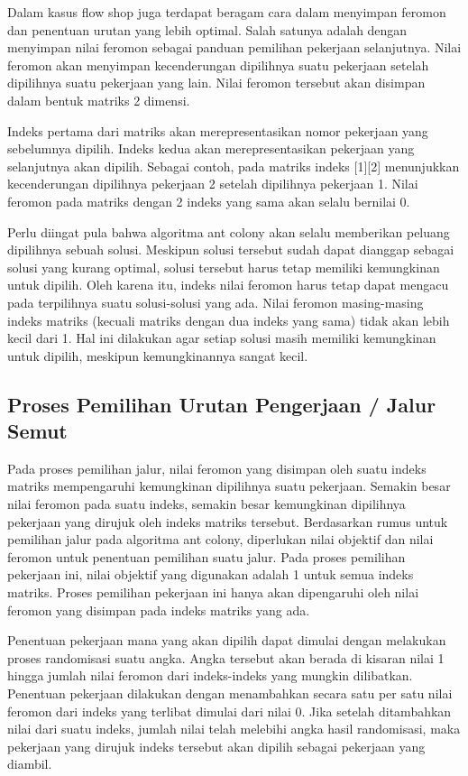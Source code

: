 	Dalam kasus flow shop juga terdapat beragam cara dalam menyimpan feromon dan
	penentuan urutan yang lebih optimal. Salah satunya adalah dengan menyimpan nilai feromon
	sebagai panduan pemilihan pekerjaan selanjutnya. Nilai feromon akan menyimpan kecenderungan
	dipilihnya suatu pekerjaan setelah dipilihnya suatu pekerjaan yang lain. Nilai feromon tersebut
	akan disimpan dalam bentuk matriks 2 dimensi.

	Indeks pertama dari matriks akan merepresentasikan nomor pekerjaan yang sebelumnya dipilih.
	Indeks kedua akan merepresentasikan pekerjaan yang selanjutnya akan dipilih. Sebagai contoh,
	pada matriks indeks [1][2] menunjukkan kecenderungan dipilihnya pekerjaan 2 setelah dipilihnya
	pekerjaan 1. Nilai feromon pada matriks dengan 2 indeks yang sama akan selalu bernilai 0.

	Perlu diingat pula bahwa algoritma ant colony akan selalu memberikan peluang dipilihnya sebuah
	solusi. Meskipun solusi tersebut sudah dapat dianggap sebagai solusi yang kurang optimal,
	solusi tersebut harus tetap memiliki kemungkinan untuk dipilih. Oleh karena itu, indeks nilai feromon
	harus tetap dapat mengacu pada terpilihnya suatu solusi-solusi yang ada. Nilai feromon
	masing-masing indeks matriks (kecuali matriks dengan dua indeks yang sama) tidak akan lebih kecil
	dari 1. Hal ini dilakukan agar setiap solusi masih memiliki kemungkinan untuk dipilih, meskipun
	kemungkinannya sangat kecil.

\subsection{Proses Pemilihan Urutan Pengerjaan / Jalur Semut}
	Pada proses pemilihan jalur, nilai feromon yang disimpan oleh suatu indeks matriks mempengaruhi
	kemungkinan dipilihnya suatu pekerjaan. Semakin besar nilai feromon pada suatu indeks, semakin
	besar kemungkinan dipilihnya pekerjaan yang dirujuk oleh indeks matriks tersebut. Berdasarkan
	rumus untuk pemilihan jalur pada algoritma ant colony, diperlukan nilai objektif dan nilai feromon
	untuk penentuan pemilihan suatu jalur. Pada proses pemilihan pekerjaan ini, nilai objektif
	yang digunakan adalah 1 untuk semua indeks matriks. Proses pemilihan pekerjaan ini hanya akan
	dipengaruhi oleh nilai feromon yang disimpan pada indeks matriks yang ada.

	Penentuan pekerjaan mana yang akan dipilih dapat dimulai dengan melakukan proses randomisasi
	suatu angka. Angka tersebut akan berada di kisaran nilai 1 hingga jumlah nilai feromon
	dari indeks-indeks yang mungkin dilibatkan. Penentuan pekerjaan dilakukan dengan menambahkan
	secara satu per satu nilai feromon dari indeks yang terlibat dimulai dari nilai 0. Jika setelah
	ditambahkan nilai dari suatu indeks, jumlah nilai telah melebihi angka hasil randomisasi, maka
	pekerjaan yang dirujuk indeks tersebut akan dipilih sebagai pekerjaan yang diambil.


